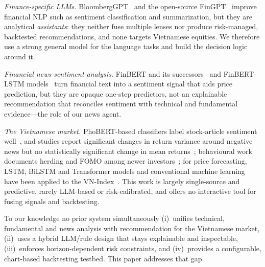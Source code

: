 \documentclass[runningheads]{llncs}
\begin{document}
\emph{Finance-specific LLMs.} BloombergGPT~\cite{bloomberggpt} and the open-source
FinGPT~\cite{fingpt} improve financial NLP such as sentiment classification and
summarization, but they are analytical \emph{assistants}: they neither fuse
multiple lenses nor produce risk-managed, backtested recommendations, and none
targets Vietnamese equities. We therefore use a strong general model for the
language tasks and build the decision logic around it.

\emph{Financial news sentiment analysis.} FinBERT and its
successors~\cite{finbert2023} and FinBERT-LSTM models~\cite{finbertlstm2022} turn
financial text into a sentiment signal that aids price prediction, but they are
opaque one-step predictors, not an explainable recommendation that reconciles
sentiment with technical and fundamental evidence---the role of our news agent.

\emph{The Vietnamese market.} PhoBERT-based classifiers label stock-article
sentiment well~\cite{phobertstock}, and studies report significant changes in return
variance around negative news but no statistically significant change in mean
returns~\cite{vnnews2023}; behavioural work documents herding and FOMO among newer
investors~\cite{vnherd2022,vnfomo}; for price forecasting, LSTM, BiLSTM and
Transformer models and conventional machine learning have been applied to the
VN-Index~\cite{vndl2025,vnlstm2021,vnml2024}. This work is largely single-source
and predictive, rarely LLM-based or risk-calibrated, and offers no interactive tool
for fusing signals and backtesting.

To our knowledge no prior system simultaneously (i)~unifies technical, fundamental
and news analysis with recommendation for the Vietnamese market, (ii)~uses a
hybrid LLM/rule design that stays explainable and inspectable, (iii)~enforces
horizon-dependent risk constraints, and (iv)~provides a configurable, chart-based
backtesting testbed. This paper addresses that gap.

\end{document}
